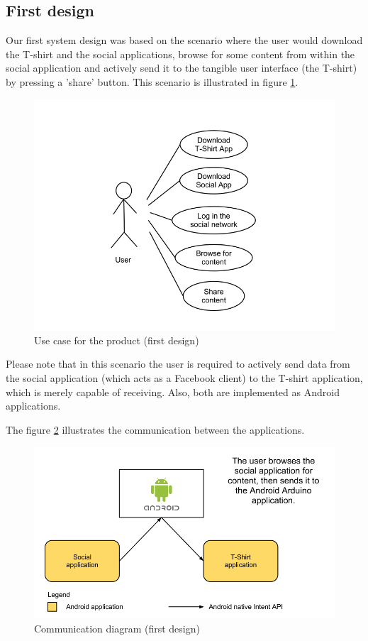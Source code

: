 \subsection{First design}
Our first system design was based on the scenario where the user would download the T-shirt
and the social applications, browse for some content from within the social application
and actively send it to the tangible user interface (the T-shirt) by pressing a 'share' button.
This scenario is illustrated in figure \ref{fig:design-usecase1}.

\begin{figure}[h!]
	\centering \includegraphics[scale=0.35]{img/design-usecase1}
	\caption{Use case for the product (first design)}
	\label{fig:design-usecase1}
\end{figure}

Please note that in this scenario the user is required to actively send data from
the social application (which acts as a Facebook client) to the T-shirt application,
which is merely capable of receiving. Also, both are implemented as Android applications.

The figure \ref{fig:design-resp} illustrates the communication between the applications.

\begin{figure}[h!]
	\centering \includegraphics[scale=0.35]{img/design-resp.png}
	\caption{Communication diagram (first design)}
	\label{fig:design-resp}
\end{figure}


